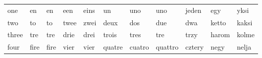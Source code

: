 \documentclass[a4paper, 20pt]{article}
\begin{document}
\begin{table}[]
\begin{tabular}{|lllllllllll|}
one                                                  & en                                                    & en                                                   & een                                                     & eins                                                 & un                                                     & uno                                                    & uno                                                    & jeden                                                & egy                                                   & yksi                                                 \\
two                                                  & to                                                    & to                                                   & twee                                                    & zwei                                                 & deux                                                   & dos                                                    & due                                                    & dwa                                                  & ketto                                                 & kaksi                                                \\
three                                                & tre                                                   & tre                                                  & drie                                                    & drei                                                 & trois                                                  & tres                                                   & tre                                                    & trzy                                                 & harom                                                 & kolme                                                \\
four                                                 & fire                                                  & fire                                                 & vier                                                    & vier                                                 & quatre                                                 & cuatro                                                 & quattro                                                & cztery                                               & negy                                                  & nelja                                                \\

\end{tabular}
\end{table}
\end{document}

